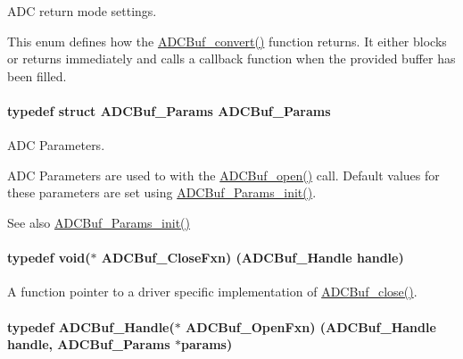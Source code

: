 A\+D\+C return mode settings. 

This enum defines how the \hyperlink{_a_d_c_buf_8h_a762253a94875258c5a71b591f03f9d97}{A\+D\+C\+Buf\+\_\+convert()} function returns. It either blocks or returns immediately and calls a callback function when the provided buffer has been filled. 
\paragraph[{A\+D\+C\+Buf\+\_\+\+Params}]{\setlength{\rightskip}{0pt plus 5cm}typedef struct {\bf A\+D\+C\+Buf\+\_\+\+Params}  {\bf A\+D\+C\+Buf\+\_\+\+Params}}\label{_a_d_c_buf_8h_aa25bdf18217501abe1581cf2a1a795b0}


A\+D\+C Parameters. 

A\+D\+C Parameters are used to with the \hyperlink{_a_d_c_buf_8h_a0b63bca2e8f8e5b58f0c657ac662c97b}{A\+D\+C\+Buf\+\_\+open()} call. Default values for these parameters are set using \hyperlink{_a_d_c_buf_8h_ae6ddd34c34fd06cdede98fb01033cc47}{A\+D\+C\+Buf\+\_\+\+Params\+\_\+init()}.

\begin{DoxySeeAlso}{See also}
\hyperlink{_a_d_c_buf_8h_ae6ddd34c34fd06cdede98fb01033cc47}{A\+D\+C\+Buf\+\_\+\+Params\+\_\+init()} 
\end{DoxySeeAlso}
\paragraph[{A\+D\+C\+Buf\+\_\+\+Close\+Fxn}]{\setlength{\rightskip}{0pt plus 5cm}typedef void($\ast$ A\+D\+C\+Buf\+\_\+\+Close\+Fxn) ({\bf A\+D\+C\+Buf\+\_\+\+Handle} handle)}\label{_a_d_c_buf_8h_a94dfd94e96f6c7e15a9da57feddd60dc}


A function pointer to a driver specific implementation of \hyperlink{_a_d_c_buf_8h_a04ab5fae5da8f9ff77ab3ae4974d8f7d}{A\+D\+C\+Buf\+\_\+close()}. 

\paragraph[{A\+D\+C\+Buf\+\_\+\+Open\+Fxn}]{\setlength{\rightskip}{0pt plus 5cm}typedef {\bf A\+D\+C\+Buf\+\_\+\+Handle}($\ast$ A\+D\+C\+Buf\+\_\+\+Open\+Fxn) ({\bf A\+D\+C\+Buf\+\_\+\+Handle} handle, {\bf A\+D\+C\+Buf\+\_\+\+Params} $\ast$params)}\label{_a_d_c_buf_8h_ae6db2b63af06cf407f74c7d7779eb391}


